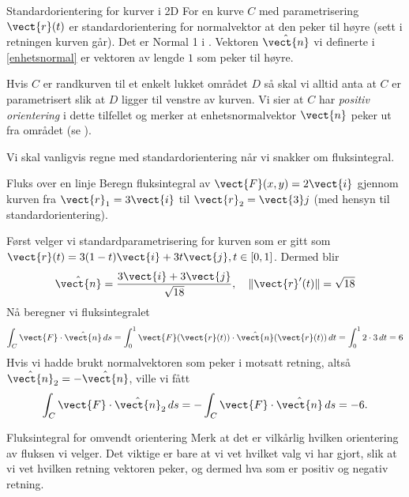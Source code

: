 \begin{oppsum}{Standardorientering for kurver i 2D}
For en kurve $C$ med parametrisering $\vect{r}(t)$ er standardorientering for normalvektor at den peker til høyre (sett i retningen kurven går). Det er Normal 1 i .
Vektoren $\hat{\vect{n}}$ vi definerte i \eqref{enhetsnormal} er vektoren av lengde $1$ som peker til høyre.

Hvis $C$ er randkurven til et enkelt lukket området $D$ så skal vi alltid anta at $C$ er parametrisert slik at $D$ ligger til venstre av kurven. Vi sier at \( C \) har \emph{positiv orientering} i dette tilfellet og merker at enhetsnormalvektor $\vect{n}$ peker ut fra området (se ).
\end{oppsum}
%
Vi skal vanligvis regne med standardorientering når vi snakker om fluksintegral.

\begin{eks}{Fluks over en linje}
Beregn fluksintegral av $\vect{F}(x,y)=2\vect{i}$ gjennom kurven fra $\vect{r}_1=3\vect{i}$ til $\vect{r}_2=\vect{3}j$ (med hensyn til standardorientering).

Først velger vi standardparametrisering for kurven som er gitt som $\vect{r}(t)=3(1-t)\vect{i}+3t\vect{j}, t \in [0,1]$. 
Dermed blir 
\[\hat{\vect{n}} = \frac{3 \vect{i}+3\vect{j}}{\sqrt{18}}, \quad \lVert \vect{r}'(t)\rVert = \sqrt{18}\]
Nå beregner vi fluksintegralet
\[\int_C \vect{F} \cdot \hat{\vect{n}}\, ds = \int_0^1 \vect{F}(\vect{r}(t))\cdot \hat{\vect{n}}(\vect{r}(t)) \,dt= \int_0^12\cdot 3 \, dt = 6\]
Hvis vi hadde brukt normalvektoren som peker i motsatt retning, altså $\hat{\vect{n}}_2=-\hat{\vect{n}}$, ville vi fått
\[\int_C \vect{F} \cdot \hat{\vect{n}}_2\, ds = -\int_C\vect{F} \cdot \hat{\vect{n}}\, ds =-6.\]
\end{eks}

\begin{rem}{Fluksintegral for omvendt orientering}
Merk at det er vilkårlig hvilken orientering av fluksen vi velger. Det viktige er bare at vi vet hvilket valg vi har gjort, slik at vi vet hvilken retning vektoren peker, og dermed hva som er positiv og negativ retning.
\end{rem}

%
